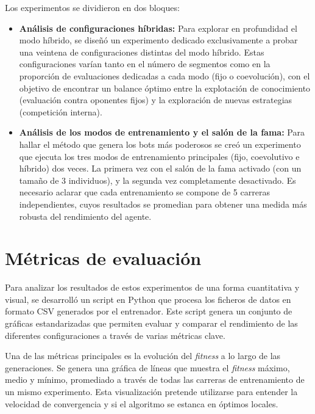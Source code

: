 Los experimentos se dividieron en dos bloques:
\begin{itemize}
	\item \textbf{Análisis de configuraciones híbridas:} Para explorar en profundidad el modo híbrido, se diseñó un experimento dedicado exclusivamente a probar una veintena de configuraciones distintas del modo híbrido. Estas configuraciones varían tanto en el número de segmentos como en la proporción de evaluaciones dedicadas a cada modo (fijo o coevolución), con el objetivo de encontrar un balance óptimo entre la explotación de conocimiento (evaluación contra oponentes fijos) y la exploración de nuevas estrategias (competición interna).
	\item \textbf{Análisis de los modos de entrenamiento y el salón de la fama:} Para hallar el método que genera los bots más poderosos se creó un experimento que ejecuta los tres modos de entrenamiento principales (fijo, coevolutivo e híbrido) dos veces. La primera vez con el salón de la fama activado (con un tamaño de 3 individuos), y la segunda vez completamente desactivado. Es necesario aclarar que cada entrenamiento se compone de 5 carreras independientes, cuyos resultados se promedian para obtener una medida más robusta del rendimiento del agente.
\end{itemize}

\section{Métricas de evaluación} \label{sec:metricas_evaluacion}

Para analizar los resultados de estos experimentos de una forma cuantitativa y visual, se desarrolló un script en Python que procesa los ficheros de datos en formato CSV generados por el entrenador. Este script genera un conjunto de gráficas estandarizadas que permiten evaluar y comparar el rendimiento de las diferentes configuraciones a través de varias métricas clave.

Una de las métricas principales es la evolución del \textit{fitness} a lo largo de las generaciones. Se genera una gráfica de líneas que muestra el \textit{fitness} máximo, medio y mínimo, promediado a través de todas las carreras de entrenamiento de un mismo experimento. Esta visualización pretende utilizarse para entender la velocidad de convergencia y si el algoritmo se estanca en óptimos locales.

